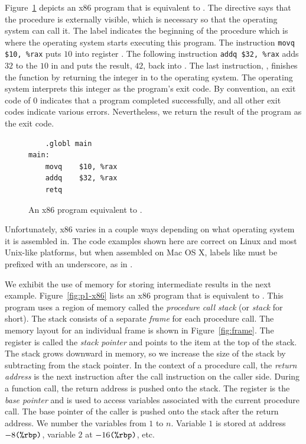 \documentclass[11pt]{book}
\begin{document}
Figure~\ref{fig:p0-x86} depicts an x86 program that is equivalent
to . The  directive says that the
 procedure is externally visible, which is necessary so
that the operating system can call it. The label 
indicates the beginning of the  procedure which is where
the operating system starts executing this program.  The instruction
\lstinline{movq $10, %rax} puts $10$ into register . The
following instruction \lstinline{addq $32, %rax} adds $32$ to the
$10$ in  and puts the result, $42$, back into
  .
%
The last instruction, , finishes the  function by
returning the integer in  to the operating system. The
operating system interprets this integer as the program's exit
code. By convention, an exit code of 0 indicates that a program
completed successfully, and all other exit codes indicate various
errors.  Nevertheless, we return the result of the program as the exit
code.

\begin{figure}[tbp]
\begin{lstlisting}
	.globl main
main:
	movq	$10, %rax
	addq	$32, %rax
	retq
\end{lstlisting}
\caption{An x86 program equivalent to .}
\label{fig:p0-x86}
\end{figure}

Unfortunately, x86 varies in a couple ways depending on what operating
system it is assembled in. The code examples shown here are correct on
Linux and most Unix-like platforms, but when assembled on Mac OS X,
labels like  must be prefixed with an underscore, as in
.

We exhibit the use of memory for storing intermediate results in the
next example.  Figure~\ref{fig:p1-x86} lists an x86 program that is
equivalent to . This program uses a region of
memory called the \emph{procedure call stack} (or \emph{stack} for
short). The stack consists of a separate \emph{frame} for each
procedure call. The memory layout for an individual frame is shown in
Figure~\ref{fig:frame}.  The register  is called the
\emph{stack pointer} and points to the item at the top of the
stack. The stack grows downward in memory, so we increase the size of
the stack by subtracting from the stack pointer.  In the context of a
procedure call, the \emph{return address} is the next instruction
after the call instruction on the caller side. During a function call,
the return address is pushed onto the stack.  The register 
is the \emph{base pointer} and is used to access variables associated
with the current procedure call.  The base pointer of the caller is
pushed onto the stack after the return address. We number the
variables from $1$ to $n$. Variable $1$ is stored at address
$-8\texttt{(\%rbp)}$, variable $2$ at $-16\texttt{(\%rbp)}$, etc.
\end{document}
